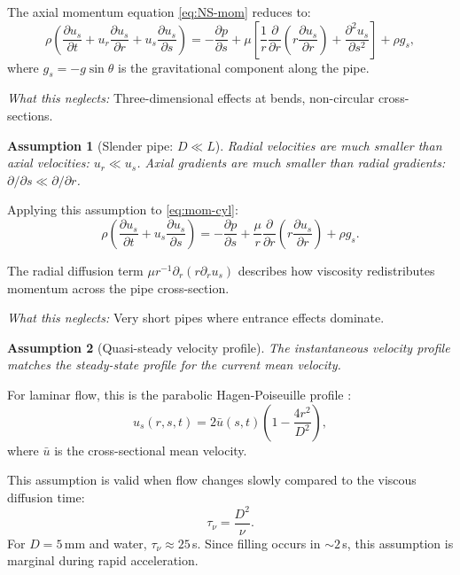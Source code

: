 \documentclass[11pt,a4paper]{article}
\newtheorem{assumption}{Assumption}
\theoremstyle{definition}
\begin{document}
The axial momentum equation \eqref{eq:NS-mom} reduces to:
\begin{equation}
  \rho\left(\frac{\partial u_s}{\partial t} + u_r\frac{\partial u_s}{\partial r} + u_s\frac{\partial u_s}{\partial s}\right) = -\frac{\partial p}{\partial s} + \mu\left[\frac{1}{r}\frac{\partial}{\partial r}\left(r\frac{\partial u_s}{\partial r}\right) + \frac{\partial^2 u_s}{\partial s^2}\right] + \rho g_s,
  \label{eq:mom-cyl}
\end{equation}
where $g_s = -g\sin\theta$ is the gravitational component along the pipe.

\textit{What this neglects:} Three-dimensional effects at bends, non-circular cross-sections.

\begin{assumption}[Slender pipe: $D \ll L$]
Radial velocities are much smaller than axial velocities: $u_r \ll u_s$. Axial gradients are much smaller than radial gradients: $\partial/\partial s \ll \partial/\partial r$.
\end{assumption}

Applying this assumption to \eqref{eq:mom-cyl}:
\begin{equation}
  \rho\left(\frac{\partial u_s}{\partial t} + u_s\frac{\partial u_s}{\partial s}\right) = -\frac{\partial p}{\partial s} + \frac{\mu}{r}\frac{\partial}{\partial r}\left(r\frac{\partial u_s}{\partial r}\right) + \rho g_s.
  \label{eq:mom-slender}
\end{equation}

The radial diffusion term $\mu r^{-1}\partial_r(r\partial_r u_s)$ describes how viscosity redistributes momentum across the pipe cross-section.

\textit{What this neglects:} Very short pipes where entrance effects dominate.

\begin{assumption}[Quasi-steady velocity profile]
The instantaneous velocity profile matches the steady-state profile for the current mean velocity.
\end{assumption}

For laminar flow, this is the parabolic Hagen-Poiseuille profile \citep{hagen1839,poiseuille1840}:
\begin{equation}
  u_s(r,s,t) = 2\bar{u}(s,t)\left(1 - \frac{4r^2}{D^2}\right),
  \label{eq:poiseuille}
\end{equation}
where $\bar{u}$ is the cross-sectional mean velocity.

This assumption is valid when flow changes slowly compared to the viscous diffusion time:
\begin{equation}
  \tau_\nu = \frac{D^2}{\nu}.
  \label{eq:tau-nu}
\end{equation}
For $D = 5$\,mm and water, $\tau_\nu \approx 25$\,s. Since filling occurs in $\sim 2$\,s, this assumption is marginal during rapid acceleration.
\end{document}
